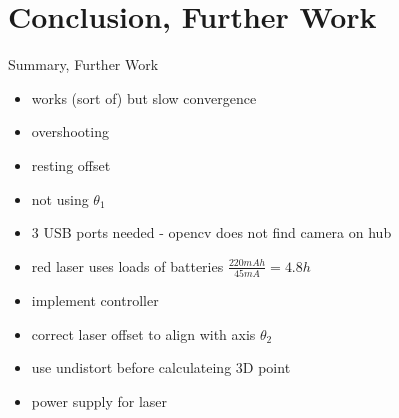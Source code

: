 \documentclass{beamer}
\begin{document}
\section{Conclusion, Further Work}
\frame{\tableofcontents[currentsection]}

\begin{frame}{Summary, Further Work}

\begin{itemize}
	\item works (sort of) but slow convergence
	\item overshooting 
	\item resting offset 
	\item not using $\theta_1$
	\item 3 USB ports needed - opencv does not find camera on hub
	\item red laser uses loads of batteries $\frac{220 mAh}{45 mA} = 4.8 h$
	\bigskip
	\item implement controller 
	\item correct laser offset to align with axis $\theta_2$
	\item use undistort before calculateing 3D point
	\item power supply for laser
\end{itemize}

\end{frame}
\end{document}
